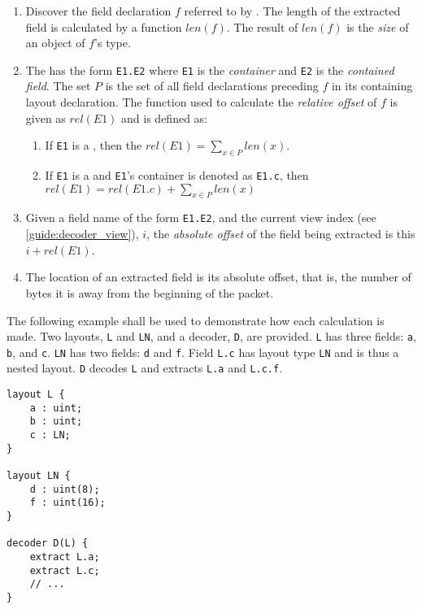 \begin{enumerate}
\item Discover the field declaration $f$ referred to by . The length of the extracted field is calculated by a function $len(f)$. The result of $len(f)$ is the \textit{size} of an object of $f$'s type.

\item The  has the form \texttt{E1.E2} where \texttt{E1} is the \textit{container} and \texttt{E2} is the \textit{contained field}. The set $P$ is the set of all field declarations preceding $f$ in its containing layout declaration. The function used to calculate the \textit{relative offset} of $f$ is given as $rel(E1)$ and is defined as:

\begin{enumerate}

\item If \texttt{E1} is a , then the $rel(E1) = \sum_{x \in P}{} len(x)$.

\item If \texttt{E1} is a  and \texttt{E1}'s container is denoted as \texttt{E1.c}, then $rel(E1) = rel(E1.c) + \sum_{x \in P}{} len(x)$

\end{enumerate}

\item Given a field name of the form \texttt{E1.E2}, and the current view index (see \ref{guide:decoder_view}), $i$, the \textit{absolute offset} of the field being extracted is this $i + rel(E1)$.

\item The location of an extracted field is its absolute offset, that is, the number of bytes it is away from the beginning of the packet.
\end{enumerate}

The following example shall be used to demonstrate how each calculation is made. Two layouts, \texttt{L} and \texttt{LN}, and a decoder, \texttt{D}, are provided. \texttt{L} has three fields: \texttt{a}, \texttt{b}, and \texttt{c}.  \texttt{LN} has two fields: \texttt{d} and \texttt{f}. Field \texttt{L.c} has layout type \texttt{LN} and is thus a nested layout. \texttt{D} decodes \texttt{L} and extracts \texttt{L.a} and \texttt{L.c.f}.

\begin{minip}
\begin{lstlisting}
layout L {
	a : uint;
	b : uint;
	c : LN;
}

layout LN {
	d : uint(8);
	f : uint(16);
}

decoder D(L) {
	extract L.a;
	extract L.c;
	// ...
}
\end{lstlisting}
\end{minip}

